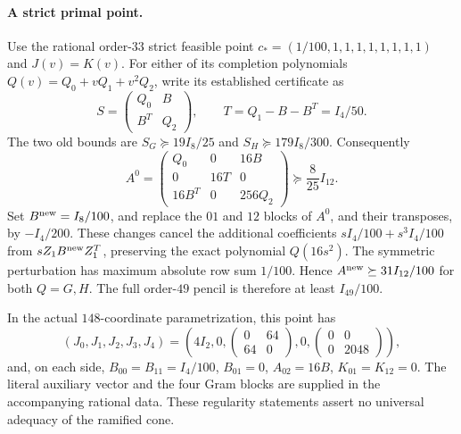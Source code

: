 \paragraph{A strict primal point.}
Use the rational order-$33$ strict feasible point
$c_*=(1/100,1,1,1,1,1,1,1,1)$ and $J(v)=K(v)$.
For either of its completion polynomials $Q(v)=Q_0+vQ_1+v^2Q_2$,
write its established certificate as
\[
 S=\begin{pmatrix}Q_0&B\\B^T&Q_2\end{pmatrix},\qquad
 T=Q_1-B-B^T=I_4/50.
\]
The two old bounds are $S_G\succeq19I_8/25$ and
$S_H\succeq179I_8/300$. Consequently
\[
 A^0=\begin{pmatrix}
 Q_0&0&16B\\0&16T&0\\16B^T&0&256Q_2
 \end{pmatrix}\succeq\frac8{25}I_{12}.
\]
Set $B^{\rm new}=I_8/100$, and replace the $01$ and $12$ blocks of
$A^0$, and their transposes, by $-I_4/200$. These changes cancel
the additional coefficients $sI_4/100+s^3I_4/100$ from
$sZ_1B^{\rm new}Z_1^T$, preserving the exact polynomial $Q(16s^2)$.
The symmetric perturbation has maximum absolute row sum $1/100$.
Hence $A^{\rm new}\succeq31I_{12}/100$ for both $Q=G,H$.
The full order-$49$ pencil is therefore at least $I_{49}/100$.

In the actual $148$-coordinate parametrization, this point has
\[
 (J_0,J_1,J_2,J_3,J_4)=
 \left(4I_2,0,
       \begin{pmatrix}0&64\\64&0\end{pmatrix},0,
       \begin{pmatrix}0&0\\0&2048\end{pmatrix}\right),
\]
and, on each side,
$B_{00}=B_{11}=I_4/100$, $B_{01}=0$, $A_{02}=16B$,
$K_{01}=K_{12}=0$. The literal auxiliary vector and the four Gram
blocks are supplied in the accompanying rational data. These
regularity statements assert no universal adequacy of the ramified cone.
